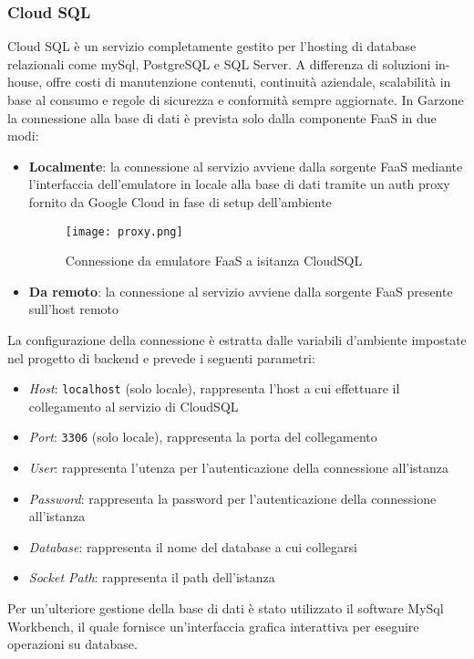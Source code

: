 \subsubsection{Cloud SQL}
Cloud SQL è un servizio completamente gestito per l'hosting di database relazionali come mySql, PostgreSQL e SQL Server. A differenza di soluzioni in-house, offre costi di manutenzione contenuti, continuità aziendale, scalabilità in base al consumo e regole di sicurezza e conformità sempre aggiornate. In Garzone la connessione alla base di dati è prevista solo dalla componente FaaS in due modi:
\begin{itemize}
    \item \textbf{Localmente}: la connessione al servizio avviene dalla sorgente FaaS mediante l'interfaccia dell'emulatore in locale alla base di dati tramite un auth proxy fornito da Google Cloud in fase di setup dell'ambiente 
    \begin{figure}[!htb]
        \centering
        \texttt{[image: proxy.png]}
        \caption{Connessione da emulatore FaaS a isitanza CloudSQL}
    \end{figure}
    \item \textbf{Da remoto}: la connessione al servizio avviene dalla sorgente FaaS presente sull'host remoto
\end{itemize}
La configurazione della connessione è estratta dalle variabili d'ambiente impostate nel progetto di backend e prevede i seguenti parametri:
\begin{itemize}
    \item \textit{Host}: \lstinline[basicstyle=\ttfamily]!localhost! (solo locale), rappresenta l'host a cui effettuare il collegamento al servizio di CloudSQL
    \item \textit{Port}: \lstinline[basicstyle=\ttfamily]!3306! (solo locale), rappresenta la porta del collegamento
    \item \textit{User}: rappresenta l'utenza per l'autenticazione della connessione all'istanza
    \item \textit{Password}: rappresenta la password per l'autenticazione della connessione all'istanza
    \item \textit{Database}: rappresenta il nome del database a cui collegarsi
    \item \textit{Socket Path}: rappresenta il path dell'istanza  
\end{itemize} 
Per un'ulteriore gestione della base di dati è stato utilizzato il software MySql Workbench, il quale fornisce un'interfaccia grafica interattiva per eseguire operazioni su database. 

